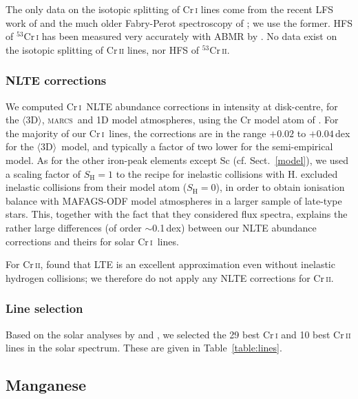 \documentclass[traditabstract]{aa}
\newcommand{\oneDAV}{$\langle\mathrm{3D}\rangle$}
\newcommand{\marcs}{\textsc{marcs}}
\newcommand{\altcri}{Cr\,\textsc{i}}
\newcommand{\altcrii}{Cr\,\textsc{ii}}
\newcommand{\cri}{\altcri\ }
\begin{document}
The only data on the isotopic splitting of Cr\,\textsc{i} lines come from the recent LFS work of \citet{Furmann05} and the much older Fabry-Perot spectroscopy of \citet{Heilig67}; we use the former.  HFS of $^{53}$Cr\,\textsc{i} has been measured very accurately with ABMR by \citet{Jarosz07}.  No data exist on the isotopic splitting of Cr\,\textsc{ii} lines, nor HFS of $^{53}$Cr\,\textsc{ii}.

\subsubsection{NLTE corrections}
\label{CrNLTE}
We computed \cri NLTE abundance corrections in intensity at disk-centre, for the \oneDAV , \marcs\ and  1D model atmospheres, using the Cr model atom of \citet{Bergemann10}. For the majority of our \cri lines, the corrections are in the range $+0.02$ to $+0.04$\,dex for the \oneDAV\ model, and typically a factor of two lower for the  semi-empirical model. As for the other iron-peak elements except Sc (cf. Sect.\ \ref{model}), we used a scaling factor of $S_\mathrm{H}=1$ to the \citet{Drawin69} recipe for inelastic collisions with H. \citet{Bergemann10} excluded inelastic  collisions from their model atom ($S_\mathrm{H}=0$), in order to obtain ionisation balance with MAFAGS-ODF model atmospheres in a larger sample of late-type stars. This, together with the fact that they considered flux spectra, explains the rather large differences (of order $\sim$0.1\,dex) between our NLTE abundance corrections and theirs for solar \cri lines.  

For \altcrii, \citet{Bergemann10} found that LTE is an excellent approximation even without inelastic hydrogen collisions; we therefore do not apply any NLTE corrections for \altcrii.

\subsubsection{Line selection}
\label{Crlineselection}

Based on the solar analyses by \citet{Sobeck07} and \citet{Biemont78c}, we selected the 29 best Cr\,\textsc{i} and 10 best Cr\,\textsc{ii} lines in the solar spectrum.  These are given in Table~\ref{table:lines}.

\subsection{Manganese}
\label{Mnatomicdata}
\end{document}
